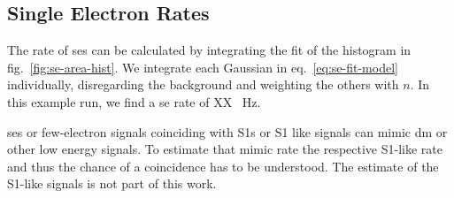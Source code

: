 
\FloatBarrier
\subsection{Single Electron Rates}
\label{ssec:rate}
\FloatBarrier


The rate of \glspl{se} can be calculated by integrating the fit of the histogram in fig.~\ref{fig:se-area-hist}.
We integrate each Gaussian in eq.~\ref{eq:se-fit-model} individually, disregarding the background and weighting the others with $ n $.
In this example run, we find a \gls{se} rate of XX \SI{}{\hertz}.

\glspl{se} or few-electron signals coinciding with S1s or S1 like signals can mimic \gls{dm} or other low energy signals.
To estimate that mimic rate the respective S1-like rate and thus the chance of a coincidence has to be understood.
The estimate of the S1-like signals is not part of this work.







